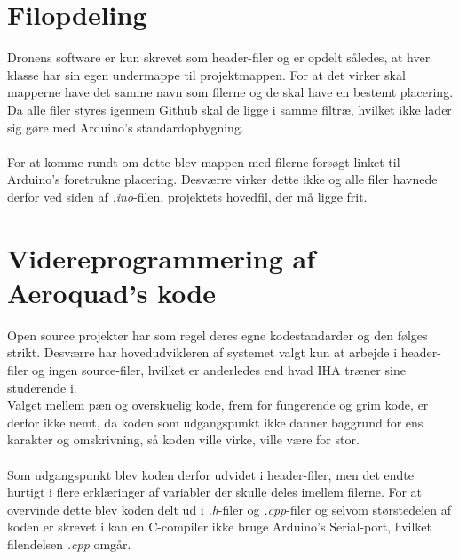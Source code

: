\documentclass[Main]{subfiles}
\begin{document}
\section{Filopdeling}
Dronens software er kun skrevet som header-filer og er opdelt således, at hver klasse har sin egen undermappe til projektmappen.
For at det virker skal mapperne have det samme navn som filerne og de skal have en bestemt placering.
\\
Da alle filer styres igennem Github skal de ligge i samme filtræ, hvilket ikke lader sig gøre med Arduino's standardopbygning.
\\
\\
For at komme rundt om dette blev mappen med filerne forsøgt linket til Arduino's foretrukne  placering.
Desværre virker dette ikke og alle filer havnede derfor ved siden af \textit{.ino}-filen, projektets hovedfil, der må ligge frit.


\section{Videreprogrammering af Aeroquad's kode}
Open source projekter har som regel deres egne kodestandarder og den følges strikt.
Desværre har hovedudvikleren af systemet valgt kun at arbejde i header-filer og ingen source-filer, hvilket er anderledes end hvad IHA træner sine studerende i.
\\
Valget mellem pæn og overskuelig kode, frem for fungerende og grim kode, er derfor ikke nemt, da koden som udgangspunkt ikke danner baggrund for ens karakter og omskrivning, så koden ville virke, ville være for stor.
\\
\\
Som udgangspunkt blev koden derfor udvidet i header-filer, men det endte hurtigt i flere erklæringer af variabler der skulle deles imellem filerne. 
For at overvinde dette blev koden delt ud i \textit{.h}-filer og \textit{.cpp}-filer og selvom størstedelen af koden er skrevet i  kan en C-compiler ikke bruge Arduino's Serial-port, hvilket filendelsen \textit{.cpp} omgår.
\end{document}
